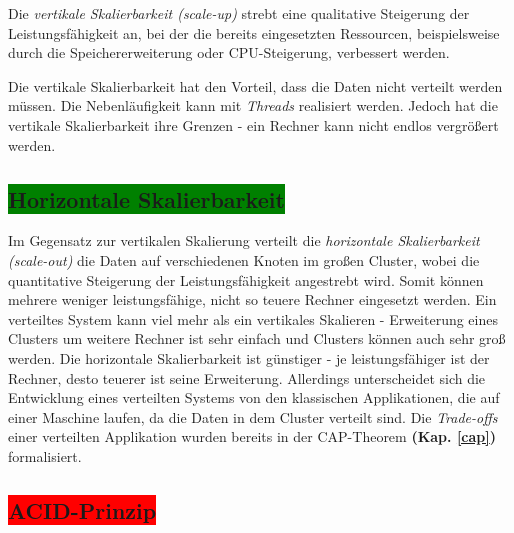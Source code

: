 Die \textit{vertikale Skalierbarkeit (scale-up)} strebt eine qualitative Steigerung der Leistungsfähigkeit an, bei der die bereits eingesetzten Ressourcen, beispielsweise durch die Speichererweiterung oder CPU-Steigerung, verbessert werden.

Die vertikale Skalierbarkeit hat den Vorteil, dass die Daten nicht verteilt werden müssen. Die Nebenläufigkeit kann mit \textit{Threads} realisiert werden. Jedoch hat die vertikale Skalierbarkeit ihre Grenzen - ein Rechner kann nicht endlos vergrößert werden. 

\subsection{\colorbox{green}{Horizontale Skalierbarkeit}}

Im Gegensatz zur vertikalen Skalierung verteilt die \textit{horizontale Skalierbarkeit (scale-out)} die Daten auf verschiedenen Knoten im großen Cluster, wobei die quantitative Steigerung der Leistungsfähigkeit angestrebt wird. Somit können mehrere weniger leistungsfähige, nicht so teuere Rechner eingesetzt werden. %
Ein verteiltes System kann viel mehr als ein vertikales Skalieren - Erweiterung eines Clusters um weitere Rechner ist sehr einfach und Clusters können auch sehr groß werden. Die horizontale Skalierbarkeit ist günstiger - je leistungsfähiger ist der Rechner, desto teuerer ist seine Erweiterung. Allerdings unterscheidet sich die Entwicklung eines verteilten Systems von den klassischen Applikationen, die auf einer Maschine laufen, da die Daten in dem Cluster verteilt sind. Die \textit{Trade-offs} einer verteilten Applikation wurden bereits in der CAP-Theorem \textbf{(Kap. \ref{cap})}  formalisiert.

\subsection{\colorbox{red}{ACID-Prinzip}}\label{acid}

